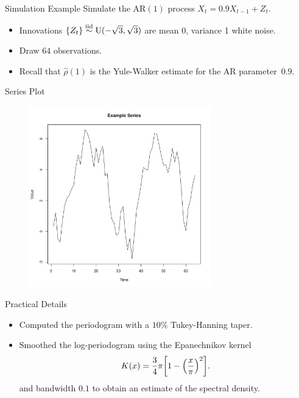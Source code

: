 
\begin{frame}{Simulation Example}
Simulate the $\textrm{AR}(1)$ process $X_t = 0.9 X_{t-1} + Z_t$.
\begin{itemize}
    \item
    Innovations $\{Z_t\} \overset{\mathrm{iid}}{\sim} \operatorname{U}(-\sqrt{3}, \sqrt{3})$ are
    mean 0, variance 1 white noise.

    \item
    Draw $64$ observations.

    \item
    Recall that $\hat{\rho}(1)$ is the Yule-Walker estimate for the
    AR parameter~$0.9$.

\end{itemize}
\end{frame}

\begin{frame}{Series Plot}
    \begin{figure}
    \centering
    \includegraphics[width = 0.7\textwidth]{res/ex1.png}
    \end{figure}
\end{frame}

\begin{frame}{Practical Details}
\begin{itemize}
    \item
    Computed the periodogram with a $10\%$ Tukey-Hanning taper.
    \item
    Smoothed the log-periodogram using the Epanechnikov kernel
        \[
        K(x) 
        = 
        \frac{3}{4}\pi \biggl[ 1 - \Bigl( \frac{x}{\pi} \Bigr)^2 \biggr].
        \]
    and bandwidth $0.1$ to obtain an estimate of the spectral density.
\end{itemize}
\end{frame}

